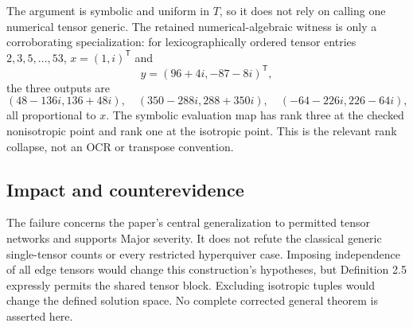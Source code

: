 \documentclass[10pt]{article}
\begin{document}
The argument is symbolic and uniform in \(T\), so it does not rely on calling one numerical tensor generic. The retained numerical-algebraic witness is only a corroborating specialization: for lexicographically ordered tensor entries \(2,3,5,\ldots,53\), \(x=(1,i)^{\mathsf T}\) and \[y=(96+4i,-87-8i)^{\mathsf T},\] the three outputs are \[(48-136i,136+48i),\quad
(350-288i,288+350i),\quad
(-64-226i,226-64i),\] all proportional to \(x\). The symbolic evaluation map has rank three at the checked nonisotropic point and rank one at the isotropic point. This is the relevant rank collapse, not an OCR or transpose convention.\par
\subsection*{Impact and counterevidence}
The failure concerns the paper’s central generalization to permitted tensor networks and supports Major severity. It does not refute the classical generic single-tensor counts or every restricted hyperquiver case. Imposing independence of all edge tensors would change this construction’s hypotheses, but Definition 2.5 expressly permits the shared tensor block. Excluding isotropic tuples would change the defined solution space. No complete corrected general theorem is asserted here.\par
\end{document}
